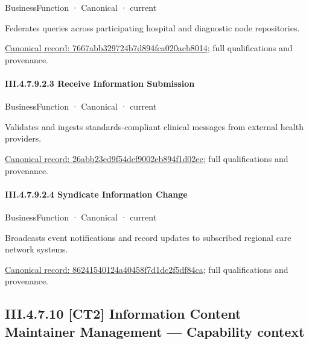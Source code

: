 \label{element:7667abb329724b7d894fca020acb8014}
{\small BusinessFunction · Canonical · current}\par

Federates queries across participating hospital and diagnostic node repositories.


{\footnotesize \href{../../../../continuum/business/business-function/7667abb329724b7d894fca020acb8014.md}{Canonical record: 7667abb329724b7d894fca020acb8014}; full qualifications and provenance.}\par
\paragraph*{III.4.7.9.2.3 Receive Information Submission}
\label{navigation:III.4.7.9.2.3}

\label{element:26abb23ed9f54dcf9002eb894f1d02ec}
{\small BusinessFunction · Canonical · current}\par

Validates and ingests standards-compliant clinical messages from external health providers.


{\footnotesize \href{../../../../continuum/business/business-function/26abb23ed9f54dcf9002eb894f1d02ec.md}{Canonical record: 26abb23ed9f54dcf9002eb894f1d02ec}; full qualifications and provenance.}\par
\paragraph*{III.4.7.9.2.4 Syndicate Information Change}
\label{navigation:III.4.7.9.2.4}

\label{element:86241540124a40458f7d1dc2f5df84ca}
{\small BusinessFunction · Canonical · current}\par

Broadcasts event notifications and record updates to subscribed regional care network systems.


{\footnotesize \href{../../../../continuum/business/business-function/86241540124a40458f7d1dc2f5df84ca.md}{Canonical record: 86241540124a40458f7d1dc2f5df84ca}; full qualifications and provenance.}\par
\subsection*{III.4.7.10 [CT2] Information Content Maintainer Management — Capability context}
\label{navigation:III.4.7.10}

